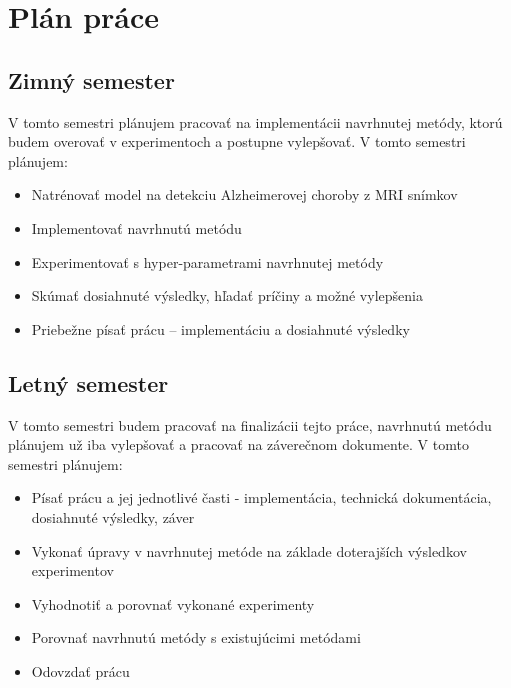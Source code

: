 \chapter{Plán práce \label{cha:plan}}

\setcounter{page}{1}

\section{Zimný semester}

    
    V tomto semestri plánujem pracovať na implementácii navrhnutej metódy, ktorú budem overovať v experimentoch a postupne vylepšovať. V tomto semestri plánujem:
    
    \begin{itemize}
        \item Natrénovať model na detekciu Alzheimerovej choroby z MRI snímkov
        \item Implementovať navrhnutú metódu
        \item Experimentovať s hyper-parametrami navrhnutej metódy
        \item Skúmať dosiahnuté výsledky, hľadať príčiny a možné vylepšenia
        \item Priebežne písať prácu -- implementáciu a dosiahnuté výsledky
    \end{itemize}



\section{Letný semester}

    
    V tomto semestri budem pracovať na finalizácii tejto práce, navrhnutú metódu plánujem už iba vylepšovať a pracovať na záverečnom dokumente. V tomto semestri plánujem:
        
    \begin{itemize}
        \item Písať prácu a jej jednotlivé časti - implementácia, technická dokumentácia, dosiahnuté výsledky, záver
        \item Vykonať úpravy v navrhnutej metóde na základe doterajších výsledkov experimentov
        \item Vyhodnotiť a porovnať vykonané experimenty
        \item Porovnať navrhnutú metódy s existujúcimi metódami
        \item Odovzdať prácu
    \end{itemize}
    
    